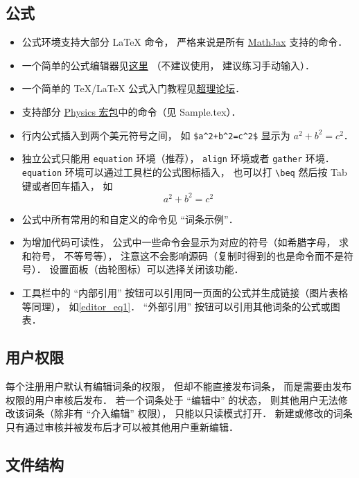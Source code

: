 \subsection{公式}
\begin{itemize}
\item 公式环境支持大部分 LaTeX 命令， 严格来说是所有 \href{https://www.mathjax.org/}{MathJax} 支持的命令．
\item 一个简单的公式编辑器见\href{https://www.codecogs.com/latex/eqneditor.php}{这里} （不建议使用， 建议练习手动输入）．
\item 一个简单的 TeX/LaTeX 公式入门教程见\href{https://chaoli.club/index.php/211}{超理论坛}．
\item 支持部分 \href{http://mirrors.ibiblio.org/CTAN/macros/latex/contrib/physics/physics.pdf}{Physics 宏包}中的命令（见 Sample.tex）．
\item 行内公式插入到两个美元符号之间， 如 \verb|$a^2+b^2=c^2$| 显示为 $a^2 + b^2 = c^2$．
\item 独立公式只能用 \verb|equation| 环境（推荐）， \verb|align| 环境或者 \verb|gather| 环境． \verb|equation| 环境可以通过工具栏的公式图标插入， 也可以打 \verb|\beq| 然后按 Tab 键或者回车插入， 如
\begin{equation}\label{editor_eq1}
a^2 + b^2 = c^2
\end{equation}
\item 公式中所有常用的和自定义的命令见 “词条示例”．
\item 为增加代码可读性， 公式中一些命令会显示为对应的符号（如希腊字母， 求和符号， 不等号等）， 注意这不会影响源码（复制时得到的也是命令而不是符号）． 设置面板（齿轮图标）可以选择关闭该功能．
\item 工具栏中的 “内部引用” 按钮可以引用同一页面的公式并生成链接（图片表格等同理）， 如\autoref{editor_eq1}． “外部引用” 按钮可以引用其他词条的公式或图表．
\end{itemize}

\subsection{用户权限}
每个注册用户默认有编辑词条的权限， 但却不能直接发布词条， 而是需要由发布权限的用户审核后发布． 若一个词条处于 “编辑中” 的状态， 则其他用户无法修改该词条（除非有 “介入编辑” 权限）， 只能以只读模式打开． 新建或修改的词条只有通过审核并被发布后才可以被其他用户重新编辑．

\subsection{文件结构}

